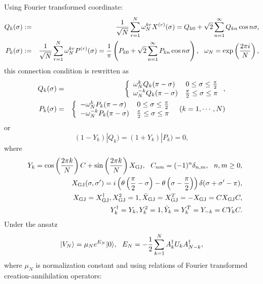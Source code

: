 \documentclass[12pt,a4paper]{article}
\begin{document}
Using Fourier transformed coordinate:
\begin{eqnarray}
Q_k(\sigma)&:=&{1\over\sqrt N}\sum_{r=1}^N \omega_N^{kr}X^{(r)}(\sigma)=Q_{k0}+\sqrt2\sum_{n=1}^\infty Q_{kn}\cos n\sigma,\nonumber \\
P_k(\sigma)&:=&{1\over\sqrt N}\sum_{r=1}^N \omega_N^{kr}P^{(r)}(\sigma)={1\over\pi}\left(P_{k0}+\sqrt2\sum_{n=1}^\infty P_{kn}\cos n\sigma\right),\ \ \omega_N=\exp\left({2\pi i\over N}\right),
\end{eqnarray}
this connection condition is rewritten as
\begin{eqnarray}
Q_k(\sigma)&=&\left\{
\begin{array}{lr}
\omega_N^kQ_k(\pi-\sigma)      &    0\leq\sigma\leq{\pi\over2}   \\
\omega_N^{-k}Q_k(\pi-\sigma)   &    {\pi\over2}\leq\sigma\leq\pi  \\
\end{array}
\right.,\nonumber \\
P_k(\sigma)&=&\left\{
\begin{array}{lr}
-\omega_N^kP_k(\pi-\sigma)      &    0\leq\sigma\leq{\pi\over2}   \\
-\omega_N^{-k}P_k(\pi-\sigma)   &    {\pi\over2}\leq\sigma\leq\pi  \\
\end{array}
\right.\ \ (k=1,\cdots,N)
\end{eqnarray}
or
\begin{equation}
(1-Y_k)|Q_k)=(1+Y_k)|P_k)=0,
\end{equation}
where
\begin{eqnarray}
&&Y_k=\cos\left({2\pi k\over N}\right) C +\sin\left({2\pi k\over N}\right)X_{\rm GJ},\ \ C_{nm}=(-1)^n\delta_{n,m}, \ \ n,m\geq0,\nonumber \\
&&X_{\rm GJ}(\sigma,\sigma')=i\left(\theta\left({\pi\over2}-\sigma\right)-\theta\left(\sigma-{\pi\over2}\right)\right)\delta(\sigma+\sigma'-\pi),\nonumber \\
&&X_{\rm GJ}=X_{\rm GJ}^\dagger,X_{\rm GJ}^2=1,{\bar X}_{\rm GJ}=X_{\rm GJ}^T=-X_{\rm GJ}=CX_{\rm GJ}C,\nonumber \\
&&Y_k^\dagger=Y_k,Y_k^2=1,{\bar Y}_k=Y_k^T=Y_{-k}=CY_kC.
\end{eqnarray}
Under the ansatz
\begin{equation}
|V_N\rangle=\mu_N e^{E_N}|0\rangle,\ \ E_N=-{1\over2}\sum_{k=1}^N A_k^\dagger U_k A_{N-k}^\dagger,
\end{equation}
where $\mu_N$ is normalization constant and
using relations of Fourier transformed creation-annihilation operators:
\end{document}
